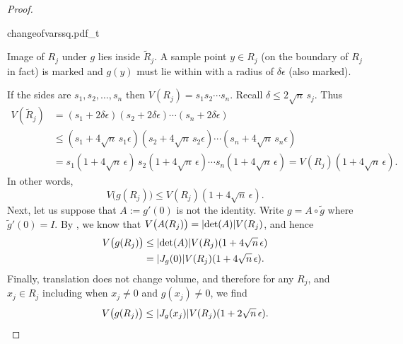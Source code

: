\begin{proof}
\begin{myfigureht}
{changeofvarssq.pdf_t}
\caption{Image of $R_j$ under $g$ lies inside
$\widetilde{R}_j$.  A sample point $y \in R_j$ (on the boundary of $R_j$ in fact) is marked
and $g(y)$ must lie within with a radius of $\delta\epsilon$
(also marked).\label{changeofvarssq:fig}}
\end{myfigureht}


If the sides are $s_1,s_2,\ldots,s_n$ then
$V(R_j) = s_1 s_2 \cdots s_n$.   Recall $\delta \leq 2\sqrt{n} \, s_j$.  Thus
\begin{equation*}
\begin{split}
V(\widetilde{R}_j) & =
(s_1+2\delta \epsilon )
(s_2+2\delta \epsilon )
\cdots
(s_n+2\delta \epsilon )
\\
& \leq
(s_1+4 \sqrt{n}\,s_1 \epsilon )
(s_2+4 \sqrt{n}\,s_2 \epsilon )
\cdots
(s_n+4 \sqrt{n}\,s_n \epsilon )
\\
& =
s_1 (1+4 \sqrt{n}\, \epsilon )
\,
s_2 (1+4 \sqrt{n}\, \epsilon )
\cdots
s_n (1+4 \sqrt{n}\, \epsilon )
=
V(R_j) (1+4\sqrt{n} \, \epsilon) .
\end{split}
\end{equation*}
In other words,
\begin{equation*}
V\bigl(g(R_j)\bigr) \leq V(R_j) (1+4\sqrt{n} \, \epsilon) .
\end{equation*}
Next, let us suppose that $A := g'(0)$ is not the identity.
Write $g = A \circ \widetilde{g}$ where $\widetilde{g}'(0) = I$.
By ,
we know that $V\bigl(A(R_j)\bigr) = \lvert {\det(A)} \rvert V(R_j)$, and hence
\begin{equation*}
\begin{split}
V\bigl(g(R_j)\bigr) & \leq
\lvert {\det(A)} \rvert V(R_j) (1+4\sqrt{n} \, \epsilon) \\
& =
\lvert {J_g(0)} \rvert V(R_j) (1+4\sqrt{n} \, \epsilon) .
\end{split}
\end{equation*}
Finally, translation does not change volume, and therefore
for any $R_j$, and $x_j \in R_j$ including when $x_j \not= 0$ and $g(x_j)
\not= 0$, we find
\begin{equation*}
V\bigl(g(R_j)\bigr) \leq
\lvert {J_g(x_j)} \rvert V(R_j) (1+2\sqrt{n} \, \epsilon) .
\end{equation*}


\end{proof}
